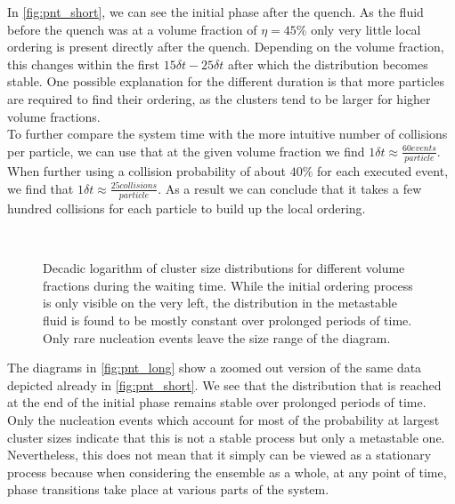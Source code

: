 In \autoref{fig:pnt_short}, we can see the initial phase after the quench. As the fluid before the quench was at a volume fraction of $\eta=45\%$ only very little local ordering is present directly after the quench. Depending on the volume fraction, this changes within the first $15 \delta t - 25 \delta t$ after which the distribution becomes stable. One possible explanation for the different duration is that more particles are required to find their ordering, as the clusters tend to be larger for higher volume fractions.\\
To further compare the system time with the more intuitive number of collisions per particle, we can use that at the given volume fraction we find  $1\delta t \approx \frac{60 events}{particle}$. When further using a collision probability of about $40 \%$ for each executed event, we find that $1\delta t \approx \frac{25 collisions}{particle}$. As a result we can conclude that it takes a few hundred collisions for each particle to build up the local ordering.\\

\begin{figure}[h]
\begin{center}
 \hspace{0.0cm}
\\
 \hspace{0.0cm}
\caption[Cluster size distributions for long waiting times]{Decadic logarithm of cluster size distributions for different volume fractions during the waiting time. While the initial ordering process is only visible on the very left, the distribution in the metastable fluid is found to be mostly constant over prolonged periods of time. Only rare nucleation events leave the size range of the diagram.}
\label{fig:pnt_long}
\end{center}
\end{figure}

The diagrams in \autoref{fig:pnt_long} show a zoomed out version of the same data depicted already in \autoref{fig:pnt_short}. We see that the distribution that is reached at the end of the initial phase remains stable over prolonged periods of time. Only the nucleation events which account for most of the probability at largest cluster sizes indicate that this is not a stable process but only a metastable one. Nevertheless, this does not mean that it simply can be viewed as a stationary process because when considering the ensemble as a whole, at any point of time, phase transitions take place at various parts of the system.

